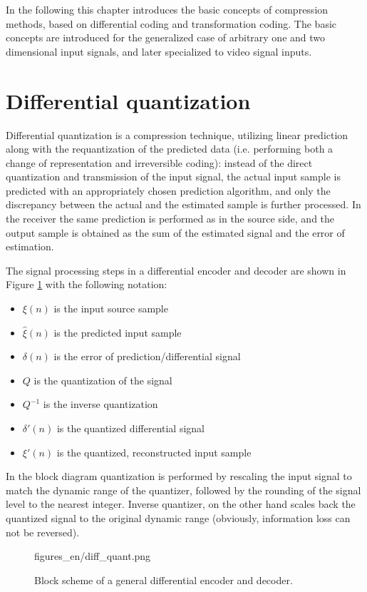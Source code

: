 In the following this chapter introduces the basic concepts of compression methods, based on differential coding and transformation coding.
The basic concepts are introduced for the generalized case of arbitrary one and two dimensional input signals, and later specialized to video signal inputs.

\section{Differential quantization}

Differential quantization is a compression technique, utilizing linear prediction along with the requantization of the predicted data (i.e. performing both a change of representation and irreversible coding):
instead of the direct quantization and transmission of the input signal, the actual input sample is predicted with an appropriately chosen prediction algorithm, and only the discrepancy between the actual and the estimated sample is further processed.
In the receiver the same prediction is performed as in the source side, and the output sample is obtained as the sum of the estimated signal and the error of estimation. 

The signal processing steps in a differential encoder and decoder are shown in Figure \ref{Fig:diff_quant} with the following notation:
\begin{itemize}
\item $\xi(n)$ is the input source sample
\item $\hat{\xi}(n)$ is the predicted input sample
\item $\delta(n)$ is the error of prediction/differential signal
\item $Q$ is the quantization of the signal
\item $Q^{-1}$ is the inverse quantization
\item $\delta'(n)$ is the quantized differential signal
\item $\xi'(n)$ is the quantized, reconstructed input sample
\end{itemize}
In the block diagram quantization is performed by rescaling the input signal to match the dynamic range of the quantizer, followed by the rounding of the signal level to the nearest integer.
Inverse quantizer, on the other hand scales back the quantized signal to the original dynamic range (obviously, information loss can not be reversed).

\begin{figure}[]
	\centering
	\begin{overpic}[width = 0.6\columnwidth ]{figures_en/diff_quant.png}
	\end{overpic}
	\caption{Block scheme of a general differential encoder and decoder.}
	\label{Fig:diff_quant}
\end{figure}

